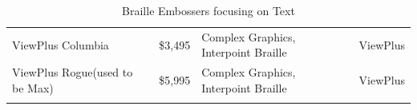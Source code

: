 \documentclass[12pt,letterpaper,twoside,openright]{report}
\begin{document}
\begin{longtable}[]{@{}
	>{\raggedright\arraybackslash}m{}
	>{\raggedright\arraybackslash}m{}
	>{\raggedright\arraybackslash}m{}
	>{\raggedright\arraybackslash}b{}@{}
	}
ViewPlus Columbia                                                                                                                               & \$3,495                                                                                                                                                          & Complex Graphics, Interpoint Braille & ViewPlus                \\[1.0em]
ViewPlus Rogue\break (used to be Max)& \$5,995                                                                                                                                                          & Complex Graphics, Interpoint Braille & ViewPlus                \\[1.0em]\hline
	\caption[ Braille Embossers focusing on Text]{ Braille Embossers focusing on Text}\label{tab:table16}
\end{longtable}
\end{document}
